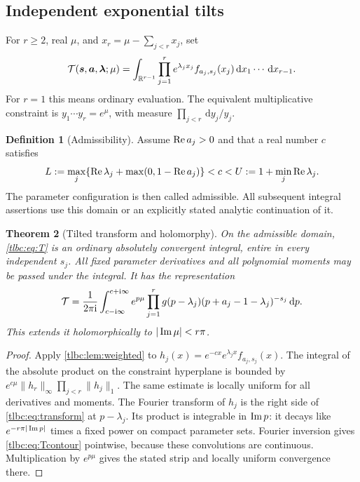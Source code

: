\documentclass[11pt,letterpaper]{article}
\numberwithin{equation}{section}
\newtheorem{theorem}{Theorem}[section]
\theoremstyle{definition}\newtheorem{definition}[theorem]{Definition}
\theoremstyle{remark}\newtheorem{remark}[theorem]{Remark}
\newcommand{\dd}{\,\mathrm d}\newcommand{\ii}{\mathrm i}
\newcommand{\bs}{\boldsymbol s}\newcommand{\ba}{\boldsymbol a}\newcommand{\bl}{\boldsymbol\lambda}
\begin{document}
\subsection{Independent exponential tilts}
For $r\ge2$, real $\mu$, and $x_r=\mu-\sum_{j<r}x_j$, set
\begin{equation}\label{tlbc:eq:T}
 \T(\bs,\ba,\bl;\mu)
 =\int_{\R^{r-1}}\prod_{j=1}^r
 e^{\lambda_jx_j}f_{a_j,s_j}(x_j)\dd x_1\cdots\dd x_{r-1}.
\end{equation}
For $r=1$ this means ordinary evaluation. The equivalent multiplicative constraint is $y_1\cdots y_r=e^\mu$, with measure $\prod_{j<r}\dd y_j/y_j$.

\begin{definition}[Admissibility]\label{tlbc:def:admissible}
Assume $\operatorname{Re} a_j>0$ and that a real number $c$ satisfies
\begin{equation}\label{tlbc:eq:admissible}
 L:=\max_j\{\operatorname{Re}\lambda_j+\max(0,1-\operatorname{Re} a_j)\}
 <c<U:=1+\min_j\operatorname{Re}\lambda_j.
\end{equation}
The parameter configuration is then called admissible. All subsequent integral assertions use this domain or an explicitly stated analytic continuation of it.
\end{definition}

\begin{theorem}[Tilted transform and holomorphy]\label{tlbc:thm:tiltedtransform}
On the admissible domain, \eqref{tlbc:eq:T} is an ordinary absolutely convergent integral, entire in every independent $s_j$. All fixed parameter derivatives and all polynomial moments may be passed under the integral. It has the representation
\begin{equation}\label{tlbc:eq:Tcontour}
 \T=\frac1{2\pi\ii}\int_{c-\ii\infty}^{c+\ii\infty}
 e^{p\mu}\prod_{j=1}^r
 g(p-\lambda_j)(p+a_j-1-\lambda_j)^{-s_j}\dd p.
\end{equation}
This extends it holomorphically to $|\operatorname{Im}\mu|<r\pi$.
\end{theorem}
\begin{proof}
Apply \cref{tlbc:lem:weighted} to
$h_j(x)=e^{-cx}e^{\lambda_jx}f_{a_j,s_j}(x)$. The integral of the absolute product on the constraint hyperplane is bounded by
$e^{c\mu}\|h_r\|_\infty\prod_{j<r}\|h_j\|_1$.
The same estimate is locally uniform for all derivatives and moments. The Fourier transform of $h_j$ is the right side of \eqref{tlbc:eq:transform} at $p-\lambda_j$. Its product is integrable in $\operatorname{Im} p$: it decays like $e^{-r\pi|\operatorname{Im} p|}$ times a fixed power on compact parameter sets. Fourier inversion gives \eqref{tlbc:eq:Tcontour} pointwise, because these convolutions are continuous. Multiplication by $e^{p\mu}$ gives the stated strip and locally uniform convergence there.
\end{proof}
\end{document}
